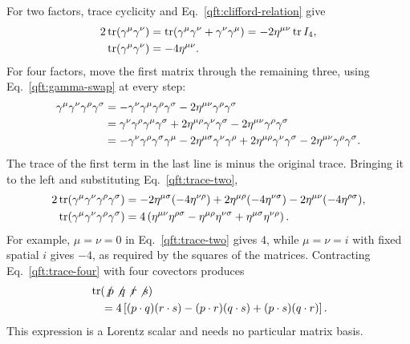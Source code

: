 For two factors, trace cyclicity and
Eq.~\eqref{qft:clifford-relation} give
\begin{align}
 2\operatorname{tr}(\gamma^\mu\gamma^\nu)
 &=\operatorname{tr}(\gamma^\mu\gamma^\nu+\gamma^\nu\gamma^\mu)
 =-2\eta^{\mu\nu}\operatorname{tr}I_4,\notag\\
 \operatorname{tr}(\gamma^\mu\gamma^\nu)&=-4\eta^{\mu\nu}.
 \label{qft:trace-two}
\end{align}
For four factors, move the first matrix through the remaining three,
using Eq.~\eqref{qft:gamma-swap} at every step:
\begin{align}
 \gamma^\mu\gamma^\nu\gamma^\rho\gamma^\sigma
 &=-\gamma^\nu\gamma^\mu\gamma^\rho\gamma^\sigma
       -2\eta^{\mu\nu}\gamma^\rho\gamma^\sigma\notag\\
 &=\gamma^\nu\gamma^\rho\gamma^\mu\gamma^\sigma
       +2\eta^{\mu\rho}\gamma^\nu\gamma^\sigma
       -2\eta^{\mu\nu}\gamma^\rho\gamma^\sigma\notag\\
 &=-\gamma^\nu\gamma^\rho\gamma^\sigma\gamma^\mu
       -2\eta^{\mu\sigma}\gamma^\nu\gamma^\rho
       +2\eta^{\mu\rho}\gamma^\nu\gamma^\sigma
       -2\eta^{\mu\nu}\gamma^\rho\gamma^\sigma.
 \label{qft:four-gamma-ordering}
\end{align}
The trace of the first term in the last line is minus the original trace.
Bringing it to the left and substituting Eq.~\eqref{qft:trace-two},
\begin{align}
 2\operatorname{tr}(\gamma^\mu\gamma^\nu\gamma^\rho\gamma^\sigma)
 &=-2\eta^{\mu\sigma}(-4\eta^{\nu\rho})
   +2\eta^{\mu\rho}(-4\eta^{\nu\sigma})
   -2\eta^{\mu\nu}(-4\eta^{\rho\sigma}),\notag\\
 \operatorname{tr}(\gamma^\mu\gamma^\nu\gamma^\rho\gamma^\sigma)
 &=4\left(\eta^{\mu\nu}\eta^{\rho\sigma}
 -\eta^{\mu\rho}\eta^{\nu\sigma}
 +\eta^{\mu\sigma}\eta^{\nu\rho}\right).
 \label{qft:trace-four}
\end{align}
For example, $\mu=\nu=0$ in Eq.~\eqref{qft:trace-two} gives $4$, while
$\mu=\nu=i$ with fixed spatial $i$ gives $-4$, as required by the squares
of the matrices. Contracting Eq.~\eqref{qft:trace-four} with four covectors
produces
\begin{align}
 &\operatorname{tr}(\not p\not q\not r\not s)\notag\\
 &\quad=4\left[(p\cdot q)(r\cdot s)-(p\cdot r)(q\cdot s)
                  +(p\cdot s)(q\cdot r)\right].
 \label{qft:slash-trace-four}
\end{align}
This expression is a Lorentz scalar and needs no particular matrix basis.

